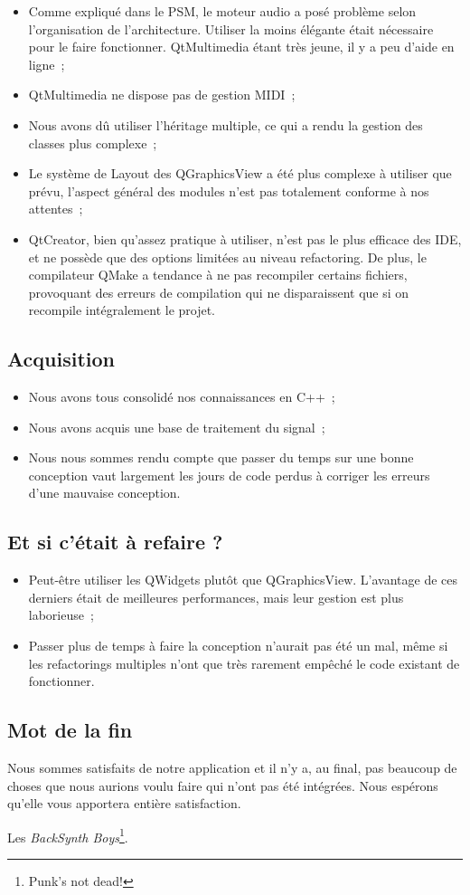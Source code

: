 \begin{itemize}
\item
  Comme expliqué dans le PSM, le moteur audio a posé problème selon
  l'organisation de l'architecture. Utiliser la moins élégante était
  nécessaire pour le faire fonctionner. QtMultimedia étant très
  jeune, il y a peu d'aide en ligne~;
\item
  QtMultimedia ne dispose pas de gestion MIDI~;
\item
  Nous avons dû utiliser l'héritage multiple, ce qui a rendu la
  gestion des classes plus complexe~;
\item
  Le système de Layout des QGraphicsView a été plus complexe à
  utiliser que prévu, l'aspect général des modules n'est pas
  totalement conforme à nos attentes~;
\item
  QtCreator, bien qu'assez pratique à utiliser, n'est pas le plus
  efficace des IDE, et ne possède que des options limitées au niveau
  refactoring. De plus, le compilateur QMake a tendance à ne pas
  recompiler certains fichiers, provoquant des erreurs de compilation
  qui ne disparaissent que si on recompile intégralement le projet.
\end{itemize}

\subsection{Acquisition}

\begin{itemize}
\item
  Nous avons tous consolidé nos connaissances en C++~;
\item
  Nous avons acquis une base de traitement du signal~;
\item
  Nous nous sommes rendu compte que passer du temps sur une bonne
  conception vaut largement les jours de code perdus à corriger les
  erreurs d'une mauvaise conception.
\end{itemize}

\subsection{Et si c'était à refaire ?}

\begin{itemize}
\item
  Peut-être utiliser les QWidgets plutôt que QGraphicsView.
  L'avantage de ces derniers était de meilleures performances, mais
  leur gestion est plus laborieuse~;
\item
  Passer plus de temps à faire la conception n'aurait pas été un mal,
  même si les refactorings multiples n'ont que très rarement empêché
  le code existant de fonctionner.
\end{itemize}

\subsection{Mot de la fin}

Nous sommes satisfaits de notre application et il n'y a, au final,
pas beaucoup de choses que nous aurions voulu faire qui n'ont pas
été intégrées. Nous espérons qu'elle vous apportera entière
satisfaction.

Les \emph{BackSynth Boys}\footnote{Punk's not dead!}.

